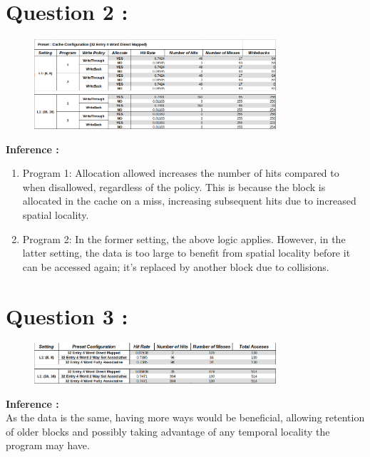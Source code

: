 \documentclass{article}
\begin{document}
\section{Question 2 :}
\begin{figure}[H]
  \centering
  \includegraphics[width=0.8\textwidth]{2.png}
  \label{fig:example}
\end{figure}
\noindent
\textbf{\large{Inference :}}\\
\begin{enumerate}[label=\alph*)]
  \item Program 1: Allocation allowed increases the number of hits compared to when disallowed, regardless of the policy. This is because the block is allocated in the cache on a miss, increasing subsequent hits due to increased spatial locality.
  \item Program 2: In the former setting, the above logic applies. However, in the latter setting, the data is too large to benefit from spatial locality before it can be accessed again; it's replaced by another block due to collisions.
\end{enumerate}
\smallskip

\section{Question 3 :}
\begin{figure}[H]
  \centering
  \includegraphics[width=0.8\textwidth]{3.png}
  \label{fig:example}
\end{figure}
\noindent
\textbf{\large{Inference :}}\\
As the data is the same, having more ways would be beneficial, allowing retention of older blocks and possibly taking advantage of any temporal locality the program may have.
\smallskip
\end{document}
